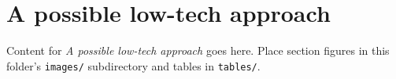 \section{A possible low-tech approach}
\label{sec:a_possible_low_tech_approach}

Content for \emph{A possible low-tech approach} goes here. Place section figures in this
folder's \texttt{images/} subdirectory and tables in \texttt{tables/}.
